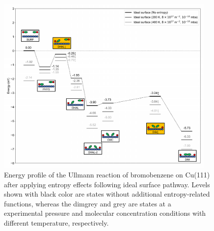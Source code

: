 \documentclass[aps,prl,reprint,amsmath,amssymb,floatfix,notitlepage]{revtex4-1}
\newcommand{\zhzh}{\color{blue}}
\newcommand{\zhzh}{\color{blue}}
\begin{document}
\begin{figure}[bt]
\centering
\includegraphics[width=0.96\textwidth]{Fig/Entropy_ideal.pdf}
\caption{{\zhzh Energy profile of the Ullmann reaction of bromobenzene on Cu(111) after applying entropy effects following ideal surface pathway. Levels shown with black color are states without additional entropy-related functions, whereas the dimgrey and grey are states at a experimental pressure and molecular concentration conditions with different temperature, respectively.}} 
\label{fig:entropy_ideal}
\end{figure}
\end{document}
